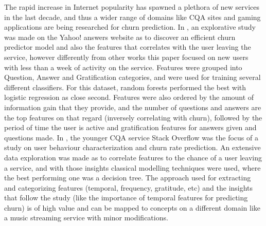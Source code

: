 \documentclass{kththesis}
\begin{document}
The rapid increase in Internet popularity has spawned a plethora of new services in the last decade, and thus a wider range of domains like CQA sites and gaming applications are being researched for churn prediction. In \citep{Dror2012}, an explorative study was made on the Yahoo! answers website as to discover an efficient churn predictor model and also the features that correlates with the user leaving the service, however differently from other works this paper focused on new users with less than a week of activity on the service. Features were grouped into Question, Answer and Gratification categories, and were used for training several different classifiers. For this dataset, random forests performed the best with logistic regression as close second. Features were also ordered by the amount of information gain that they provide, and the number of questions and answers are the top features on that regard (inversely correlating with churn), followed by the period of time the user is active and gratification features for answers given and questions made. In \citep{Pudipeddi2014}, the younger CQA service Stack Overflow was the focus of a study on user behaviour characterization and churn rate prediction. An extensive data exploration was made as to correlate features to the chance of a user leaving a service, and with those insights classical modelling techniques were used, where the best performing one was a decision tree. The approach used for extracting and categorizing features (temporal, frequency, gratitude, etc) and the insights that follow the study (like the importance of temporal features for predicting churn) is of high value and can be mapped to concepts on a different domain like a music streaming service with minor modifications. 
\end{document}
